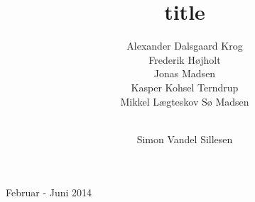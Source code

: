 \author{Alexander Dalsgaard Krog \andnext\\
    Frederik Højholt \andnext\\
    Jonas Madsen \andnext\\
    Kasper Kohsel Terndrup \andnext\\
    Mikkel Lægteskov Sø Madsen \and\\
    Simon Vandel Sillesen}

\title{title}

\begin{titlingpage}

\vspace*{2cm}
     \makebox[\linewidth]{
     }
     \vfill
     \centerline{Februar - Juni 2014}
     \clearpage


\end{titlingpage}
